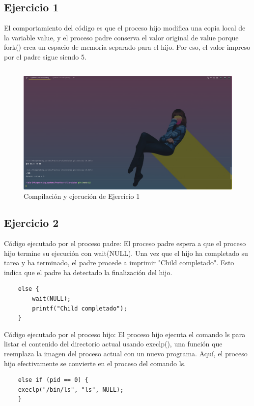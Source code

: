\documentclass{article}
\newenvironment{code}{\captionsetup{type=listing}}{}
\begin{document}
\subsection{Ejercicio 1}
El comportamiento del código es que el proceso hijo modifica una copia
local de la variable value, y el proceso padre conserva el valor 
original de value porque fork() crea un espacio de memoria separado 
para el hijo. Por eso, el valor impreso por el padre sigue siendo 5.
\begin{code}
	\inputminted{c}{../Ejercicios/e1.c}
\end{code}

\begin{figure}[h]
\caption{Compilación y ejecución de Ejercicio 1}
\centering
\includegraphics[scale=0.3,trim={0 0 20cm 25cm},clip]{ejer-e1.png}  
\end{figure}

\subsection{Ejercicio 2}
Código ejecutado por el proceso padre: El proceso padre espera a que 
el proceso hijo termine su ejecución con wait(NULL). Una vez que el 
hijo ha completado su tarea y ha terminado, el padre procede a imprimir
"Child completado". Esto indica que el padre ha detectado la 
finalización del hijo.
\begin{verbatim}
	else {
    	wait(NULL);
    	printf("Child completado");	
	}
\end{verbatim}


Código ejecutado por el proceso hijo: El proceso hijo ejecuta el 
comando ls para listar el contenido del directorio actual usando 
execlp(), una función que reemplaza la imagen del proceso actual 
con un nuevo programa. Aquí, el proceso hijo efectivamente se convierte
en el proceso del comando ls.
\begin{verbatim}
	else if (pid == 0) {
    execlp("/bin/ls", "ls", NULL);
	}
\end{verbatim}
\end{document}
